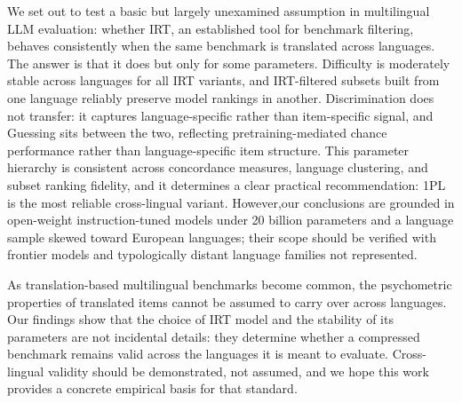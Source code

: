 \documentclass[11pt]{article}
\begin{document}
We set out to test a basic but largely unexamined assumption in multilingual LLM evaluation: whether IRT, an established tool for benchmark filtering, behaves consistently when the same benchmark is translated across languages. The answer is that it does but only for some parameters. Difficulty is moderately stable across languages for all IRT variants, and IRT-filtered subsets built from one language reliably preserve model rankings in another. Discrimination does not transfer: it captures language-specific rather than item-specific signal, and Guessing sits between the two, reflecting pretraining-mediated chance performance rather than language-specific item structure. This parameter hierarchy is consistent across concordance measures, language clustering, and subset ranking fidelity, and it determines a clear practical recommendation: 1PL is the most reliable cross-lingual variant. However,our conclusions are grounded in open-weight instruction-tuned models under 20
billion parameters and a language sample skewed toward European languages; their
scope should be verified with frontier models and typologically distant
language families not represented. 


As translation-based multilingual benchmarks become common, the psychometric properties of translated items cannot be assumed to carry over across languages. Our findings show that the choice of IRT model and the stability of its parameters are not incidental details: they determine whether a compressed benchmark remains valid across the languages it is meant to evaluate. Cross-lingual validity should be demonstrated, not assumed, and we hope this work provides a concrete empirical basis for that standard.


\end{document}

